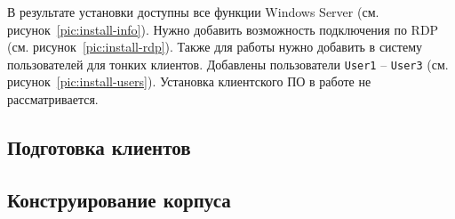 В результате установки доступны все функции Windows Server (см.
рисунок~\ref{pic:install-info}). Нужно добавить возможность подключения по RDP
(см. рисунок~\ref{pic:install-rdp}). Также для работы нужно добавить в систему пользователей
для тонких клиентов. Добавлены пользователи \texttt{User1} – \texttt{User3} (см.
рисунок~\ref{pic:install-users}). Установка клиентского ПО в работе не рассматривается.

\subsection{Подготовка клиентов}

\subsection{Конструирование корпуса}
